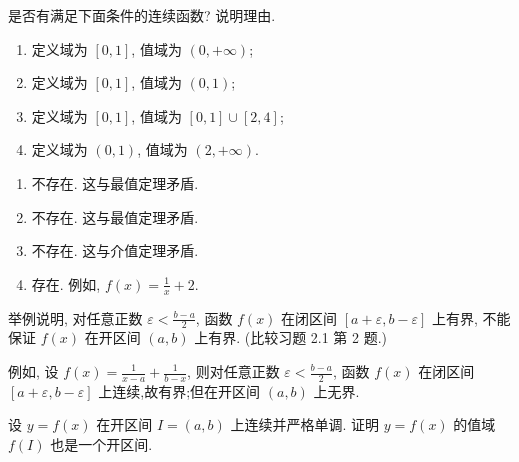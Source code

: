 \begin{exercise}[2.2.10]
    是否有满足下面条件的连续函数? 说明理由.
    \begin{enumerate}
        \item 定义域为 $[0,1]$, 值域为 $(0, +\infty)$;
        \item 定义域为 $[0,1]$, 值域为 $(0,1)$;
        \item 定义域为 $[0,1]$, 值域为 $[0,1]\cup[2,4]$;
        \item 定义域为 $(0,1)$, 值域为 $(2, +\infty)$.
    \end{enumerate}
\end{exercise}

\begin{solution}
    \begin{enumerate}
        \item 不存在. 这与最值定理矛盾.
        \item 不存在. 这与最值定理矛盾.
        \item 不存在. 这与介值定理矛盾.
        \item 存在. 例如, $f(x) = \frac{1}{x} + 2$.
    \end{enumerate}
\end{solution}

\begin{exercise}[2.2.11]
    举例说明, 对任意正数 $\varepsilon < \frac{b-a}{2}$, 函数 $f(x)$ 在闭区间 $[a+\varepsilon, b-\varepsilon]$ 上有界, 不能保证 $f(x)$ 在开区间 $(a,b)$ 上有界. (比较习题 2.1 第 2 题.)
\end{exercise}

\begin{solution}
    例如, 设 $f(x) = \frac{1}{x-a} + \frac{1}{b-x}$, 则对任意正数 $\varepsilon < \frac{b-a}{2}$, 函数 $f(x)$ 在闭区间 $[a+\varepsilon, b-\varepsilon]$ 上连续,故有界;但在开区间 $(a,b)$ 上无界.
\end{solution}

\begin{exercise}[2.2.12]
    设 $y=f(x)$ 在开区间 $I=(a,b)$ 上连续并严格单调. 证明 $y=f(x)$ 的值域 $f(I)$ 也是一个开区间.
\end{exercise}

